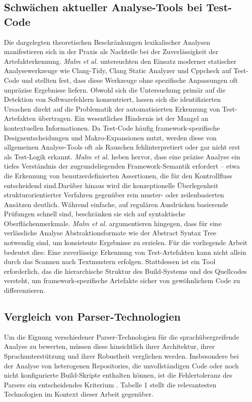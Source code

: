 \documentclass[12pt,titlepage]{article}
\begin{document}
\subsection{Schwächen aktueller Analyse-Tools bei Test-Code}
Die dargelegten theoretischen Beschränkungen lexikalischer Analysen manifestieren sich in der Praxis als Nachteile bei der Zuverlässigkeit der Artefakterkennung. \textit{Malm et al.} \cite{General_Purpose_Static_Ana_Test} untersuchten den Einsatz moderner statischer Analysewerkzeuge wie Clang-Tidy, Clang Static Analyzer und Cppcheck auf Test-Code und stellten fest, dass diese Werkzeuge ohne spezifische Anpassungen oft unpräzise Ergebnisse liefern. Obwohl sich die Untersuchung primär auf die Detektion von Softwarefehlern konzentriert, lassen sich die identifizierten Ursachen direkt auf die Problematik der automatisierten Erkennung von Test-Artefakten übertragen. Ein wesentliches Hindernis ist der Mangel an kontextuellen Informationen. Da Test-Code häufig framework-spezifische Designentscheidungen und Makro-Expansionen nutzt, werden diese von allgemeinen Analyse-Tools oft als Rauschen fehlinterpretiert oder gar nicht erst als Test-Logik erkannt. \textit{Malm et al.} \cite{General_Purpose_Static_Ana_Test} heben hervor, dass eine präzise Analyse ein tiefes Verständnis der zugrundeliegenden Framework-Semantik erfordert – etwa die Erkennung von benutzerdefinierten Assertionen, die für den Kontrollfluss entscheidend sind.Darüber hinaus wird die konzeptionelle Überlegenheit strukturorientierter Verfahren gegenüber rein muster- oder zeilenbasierten Ansätzen deutlich. Während einfache, auf regulären Ausdrücken basierende Prüfungen schnell sind, beschränken sie sich auf syntaktische Oberflächenmerkmale. \textit{Malm et al.} \cite{General_Purpose_Static_Ana_Test} argumentieren hingegen, dass für eine verlässliche Analyse Abstraktionsformate wie der Abstract Syntax Tree notwendig sind, um konsistente Ergebnisse zu erzielen. Für die vorliegende Arbeit bedeutet dies: Eine zuverlässige Erkennung von Test-Artefakten kann nicht allein durch das Scannen nach Textmustern erfolgen. Stattdessen ist ein Tool erforderlich, das die hierarchische Struktur des Build-Systems und des Quellcodes versteht, um framework-spezifische Artefakte sicher von gewöhnlichem Code zu differenzieren.

\subsection{Vergleich von Parser-Technologien}
Um die Eignung verschiedener Parser-Technologien für die sprachübergreifende Analyse zu bewerten, müssen diese hinsichtlich ihrer Architektur, ihrer Sprachunterstützung und ihrer Robustheit verglichen werden. Insbesondere bei der Analyse von heterogenen Repositories, die unvollständigen Code oder noch nicht konfigurierte Build-Skripte enthalten können, ist die Fehlertoleranz des Parsers ein entscheidendes Kriterium \cite{Comparison_Parsers}. Tabelle 1 stellt die relevantesten Technologien im Kontext dieser Arbeit gegenüber.
\end{document}
